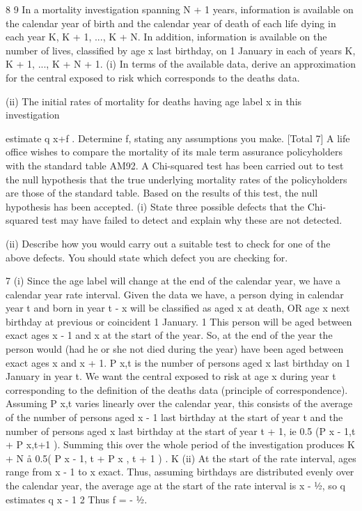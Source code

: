 \documentclass[a4paper,12pt]{article}
\begin{document}
8
9
In a mortality investigation spanning N + 1 years, information is available on the
calendar year of birth and the calendar year of death of each life dying in each year K,
K + 1, ..., K + N. In addition, information is available on the number of lives,
classified by age x last birthday, on 1 January in each of years K, K + 1, ..., K + N + 1.
(i) In terms of the available data, derive an approximation for the central exposed
to risk which corresponds to the deaths data.

(ii) The initial rates of mortality for deaths having age label x in this investigation

estimate q x+f . Determine f, stating any assumptions you make.
[Total 7]
A life office wishes to compare the mortality of its male term assurance policyholders
with the standard table AM92. A Chi-squared test has been carried out to test the null
hypothesis that the true underlying mortality rates of the policyholders are those of the
standard table. Based on the results of this test, the null hypothesis has been accepted.
(i) State three possible defects that the Chi-squared test may have failed to detect
and explain why these are not detected.

(ii) Describe how you would carry out a suitable test to check for one of the above
defects. You should state which defect you are checking for.

7
(i)
Since the age label will change at the end of the calendar year, we have a
calendar year rate interval.
Given the data we have, a person dying in calendar year t and born in year
t - x will be classified as aged x at death, OR age x next birthday at previous
or coincident 1 January. 1
This person will be aged between exact ages x - 1 and x at the start of the
year.
So, at the end of the year the person would (had he or she not died during the
year) have been aged between exact ages x and x + 1.
P x,t is the number of persons aged x last birthday on 1 January in year t.
We want the central exposed to risk at age x during year t corresponding to the
definition of the deaths data (principle of correspondence).
Assuming P x,t varies linearly over the calendar year, this consists of the
average of the number of persons aged x - 1 last birthday at the start of year t
and the number of persons aged x last birthday at the start of year
t + 1, ie 0.5 (P x - 1,t + P x,t+1 ).
Summing this over the whole period of the investigation produces
K + N
å 0.5( P x - 1, t + P x , t + 1 ) .
K
(ii)
At the start of the rate interval, ages range from x - 1 to x exact.
Thus, assuming birthdays are distributed evenly over the calendar year, the
average age at the start of the rate interval is x - 1⁄2,
so q estimates q x - 1
2
Thus f = - 1⁄2.
\end{document}
